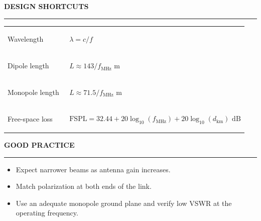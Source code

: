 \begin{tcolorbox}[
  colback=black!2,
  colframe=blue!35!black,
  fonttitle=\large\bfseries\sffamily,
  toptitle=2mm,
  bottomtitle=2mm,
  boxrule=0.7pt,
  arc=0mm,
  left=4mm,
  right=4mm,
  top=3mm,
  bottom=3mm
]
\vspace{0.18em}
\noindent
\begin{minipage}[t]{0.58\linewidth}
  {\sffamily\bfseries\textcolor{blue!35!black}{DESIGN SHORTCUTS}}\par
  \vspace{2pt}
  {\color{blue!35!black}\rule{\linewidth}{0.5pt}}\par
  \vspace{3pt}
  \scriptsize
  \renewcommand{\arraystretch}{1.2}
  \begin{tabular}{@{}>{\bfseries\raggedright\arraybackslash}p{0.30\linewidth}
                      >{\raggedright\arraybackslash}p{0.65\linewidth}@{}}
    Wavelength & \(\lambda=c/f\) \\
    Dipole length & \(L\approx143/f_{\mathrm{MHz}}\text{ m}\) \\
    Monopole length & \(L\approx71.5/f_{\mathrm{MHz}}\text{ m}\) \\
    Free-space loss & \(\mathrm{FSPL}=32.44+20\log_{10}(f_{\mathrm{MHz}})
      +20\log_{10}(d_{\mathrm{km}})\text{ dB}\) \\
  \end{tabular}
\end{minipage}
\hfill
\begin{minipage}[t]{0.38\linewidth}
  {\sffamily\bfseries\textcolor{blue!35!black}{GOOD PRACTICE}}\par
  \vspace{2pt}
  {\color{blue!35!black}\rule{\linewidth}{0.5pt}}\par
  \vspace{3pt}
  \scriptsize
  \begin{itemize}[leftmargin=1.2em,itemsep=1pt,topsep=0pt,parsep=0pt]
    \item Expect narrower beams as antenna gain increases.
    \item Match polarization at both ends of the link.
    \item Use an adequate monopole ground plane and verify low VSWR at the operating frequency.
  \end{itemize}
\end{minipage}
\end{tcolorbox}